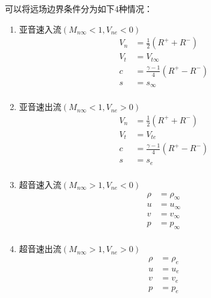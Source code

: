 \documentclass[UTF8]{ctexart}
\begin{document}
\indent 可以将远场边界条件分为如下4种情况：
\begin{enumerate}[(1)]
\item 亚音速入流$(M_{n\infty}<1,V_{ne}<0)$
\begin{equation}\label{yaru}
\begin{aligned}
V_n &= \frac{1}{2} (R^+ + R^-) \\
V_t &= V_{t\infty} \\
c &= \frac{\gamma-1}{4} (R^+ - R^-) \\
s &= s_\infty \\
\end{aligned}
\end{equation}

\item 亚音速出流$(M_{n\infty}<1,V_{ne}>0)$
\begin{equation}\label{yachu}
\begin{aligned}
V_n &= \frac{1}{2} (R^+ + R^-) \\
V_t &= V_{te} \\
c &= \frac{\gamma-1}{4} (R^+ - R^-) \\
s &= s_e \\
\end{aligned}
\end{equation}

\item 超音速入流$(M_{n\infty}>1,V_{ne}<0)$
\begin{equation}\label{chaoru}
\begin{aligned}
\rho &= \rho_\infty \\
u &= u_\infty \\
v &= v_\infty \\
p &= p_\infty \\
\end{aligned}
\end{equation}

\item 超音速出流$(M_{n\infty}>1,V_{ne}>0)$
\begin{equation}\label{chaochu}
\begin{aligned}
\rho &= \rho_e \\
u &= u_e \\
v &= v_e \\
p &= p_e \\
\end{aligned}
\end{equation}

\end{enumerate}
\end{document}
